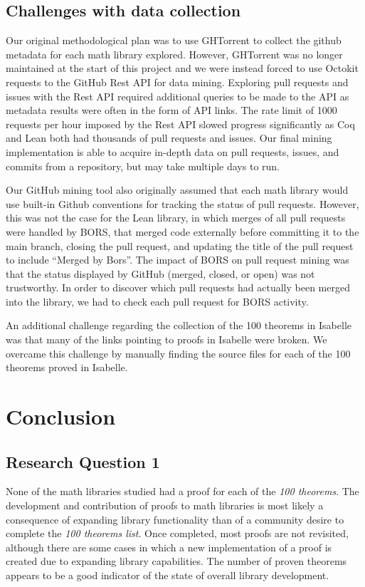 \documentclass[sigconf,nonacm]{acmart}
\begin{document}
\subsection{Challenges with data collection}

Our original methodological plan was to use GHTorrent to collect the github metadata for each math library explored. However, GHTorrent was no longer maintained at the start of this project and we were instead forced to use Octokit requests to the GitHub Rest API for data mining. Exploring pull requests and issues with the Rest API required additional queries to be made to the API as metadata results were often in the form of API links. The rate limit of 1000 requests per hour imposed by the Rest API slowed progress significantly as Coq and Lean both had thousands of pull requests and issues. Our final mining implementation is able to acquire in-depth data on pull requests, issues, and commits from a repository, but may take multiple days to run.

Our GitHub mining tool also originally assumed that each math library would use built-in Github conventions for tracking the status of pull requests. However, this was not the case for the Lean library, in which merges of all pull requests were handled by BORS, that merged code externally before committing it to the main branch, closing the pull request, and updating the title of the pull request to include “Merged by Bors”. The impact of BORS on pull request mining was that the status displayed by GitHub (merged, closed, or open) was not trustworthy. In order to discover which pull requests had actually been merged into the library, we had to check each pull request for BORS activity.

An additional challenge regarding the collection of the 100 theorems in Isabelle was that many of the links pointing to proofs in Isabelle were broken. We overcame this challenge by manually finding the source files for each of the 100 theorems proved in Isabelle.

\section{Conclusion}

\subsection{Research Question 1}
None of the math libraries studied had a proof for each of the \textit{100 theorems}. The development and contribution of proofs to math libraries is most likely a consequence of expanding library functionality than of a community desire to complete the \textit{100 theorems list}. Once completed, most proofs are not revisited, although there are some cases in which a new implementation of a proof is created due to expanding library capabilities. The number of proven theorems appears to be a good indicator of the state of overall library development.
\end{document}
